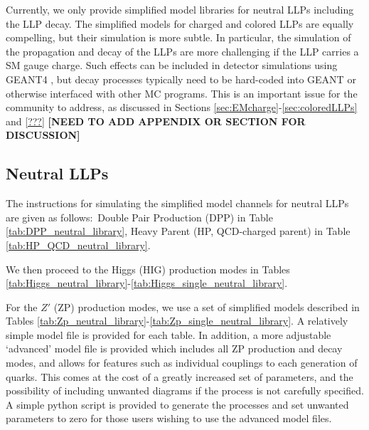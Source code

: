 Currently, we only provide simplified model libraries for neutral LLPs including the LLP decay. The simplified models for charged and colored LLPs are equally compelling, but their simulation is more subtle. In particular, the simulation of the propagation and decay of the LLPs are more challenging if the LLP carries a SM gauge charge. Such effects can be included in detector simulations using GEANT4 \cite{Agostinelli:2002hh}, but decay processes typically need to be hard-coded into GEANT or otherwise interfaced with other MC programs. This is an important issue for the community to address, as discussed in Sections \ref{sec:EMcharge}-\ref{sec:coloredLLPs} and \ref{???} {\bf [NEED TO ADD APPENDIX OR SECTION FOR DISCUSSION]}

\subsection{Neutral LLPs}

The instructions for simulating the simplified model channels for neutral LLPs are given as follows:~Double Pair Production (DPP) in Table \ref{tab:DPP_neutral_library}, Heavy Parent (HP, QCD-charged parent) in Table \ref{tab:HP_QCD_neutral_library}.

 We then proceed to the Higgs (HIG) production modes in Tables \ref{tab:Higgs_neutral_library}-\ref{tab:Higgs_single_neutral_library}.

For the $Z'$ (ZP) production modes, we use a set of simplified models described in Tables \ref{tab:Zp_neutral_library}-\ref{tab:Zp_single_neutral_library}. 
A relatively simple model file is provided for each table. In addition, a more adjustable `advanced' model file is provided which includes all ZP production and decay modes, and allows for features such as individual couplings to each generation of quarks. This comes at the cost of a greatly increased set of parameters, and the possibility of including unwanted diagrams if the process is not carefully specified. A simple python script is provided to generate the processes and set unwanted parameters to zero for those users wishing to use the advanced model files.


